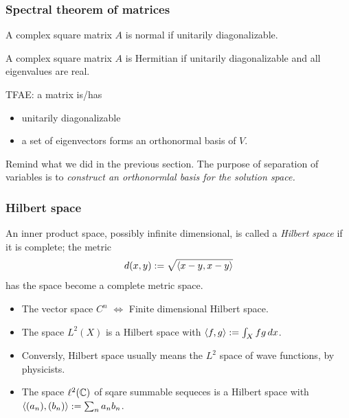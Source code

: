 \documentclass[10pt]{beamer}
\begin{document}
\begin{frame}
\frametitle{Spectral theorem of matrices}
  \begin{thm}
    A complex square matrix $A$ is normal if unitarily diagonalizable.
  \end{thm}
  \begin{thm}
    A complex square matrix $A$ is Hermitian if unitarily diagonalizable and all eigenvalues are real.
  \end{thm}
  \bigskip
  \pause TFAE: a matrix is/has
  \begin{itemize}
    \item unitarily diagonalizable
    \item a set of eigenvectors forms an orthonormal basis of $V$.
  \end{itemize}
  \pause Remind what we did in the previous section.
  The purpose of separation of variables is to \emph{construct an orthonormlal basis for the solution space.}
\end{frame}

\begin{frame}
\frametitle{Hilbert space}
  \pause
  \begin{defn}
    An inner product space, possibly infinite dimensional, is called a \emph{Hilbert space} if it is complete; the metric
    \[d(x,y):=\sqrt{\langle x-y,x-y\rangle}\]
    has the space become a complete metric space.
  \end{defn}
  \pause
  \begin{itemize}[<+->]
    \item The vector space $C^n$ $\iff$ Finite dimensional Hilbert space.
    \item The space $L^2(X)$ is a Hilbert space with $\langle f,g\rangle:=\int_X fg\,dx$.
    \item Conversly, Hilbert space usually means the $L^2$ space of wave functions, by physicists.
    \item The space $\ell^2(\mathbb{C})$ of sqare summable sequeces is a Hilbert space with $\langle(a_n),(b_n)\rangle:=\sum_na_nb_n$.
  \end{itemize}
\end{frame}
\end{document}
